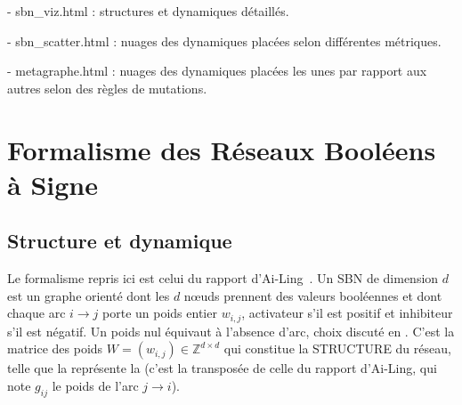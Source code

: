 \documentclass[12pt, a4paper]{article}
\begin{document}
- sbn\_viz.html : structures et dynamiques détaillés.

- sbn\_scatter.html : nuages des dynamiques placées selon différentes métriques.

- metagraphe.html : nuages des dynamiques placées les unes par rapport aux autres selon des règles de mutations.


\section{Formalisme des Réseaux Booléens à Signe}
\label{sec:formalisme}

\subsection{Structure et dynamique}
\label{sec:structure-dynamique}

Le formalisme repris ici est celui du rapport d'Ai-Ling~\cite{bonnet2023}.
Un SBN de dimension $d$ est un graphe orienté dont les $d$ nœuds prennent des valeurs booléennes et dont chaque arc $i \to j$ porte un poids entier $w_{i,j}$, activateur s'il est positif et inhibiteur s'il est négatif.
Un poids nul équivaut à l'absence d'arc, choix discuté en .
C'est la matrice des poids $W = (w_{i,j}) \in \mathbb{Z}^{d \times d}$ qui constitue la STRUCTURE du réseau, telle que la représente la  (c'est la transposée de celle du rapport d'Ai-Ling, qui note $g_{ij}$ le poids de l'arc $j \to i$).
\end{document}

